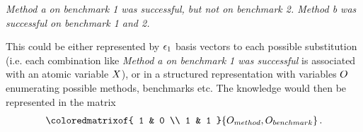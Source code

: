 \documentclass[aps,onecolumn,nofootinbib,pra]{article}
\begin{document}
    \begin{center}
        \textit{
            Method a on benchmark 1 was successful, but not on benchmark 2.
            Method b was successful on benchmark 1 and 2.
        }
    \end{center}

    This could be either represented by $\epsilon_{1}$ basis vectors to each possible substitution (i.e. each combination like \textit{Method a on benchmark 1 was successful} is associated with an atomic variable $X$), or in a structured representation with variables $O$ enumerating possible methods, benchmarks etc.
    The knowledge would then be represented in the matrix
    \begin{align*}
        \coloredmatrixof{
            1 & 0 \\
            1 & 1
        }{\indvariableof{method},\indvariableof{benchmark}} \, .
    \end{align*}

    
    
\end{document}
